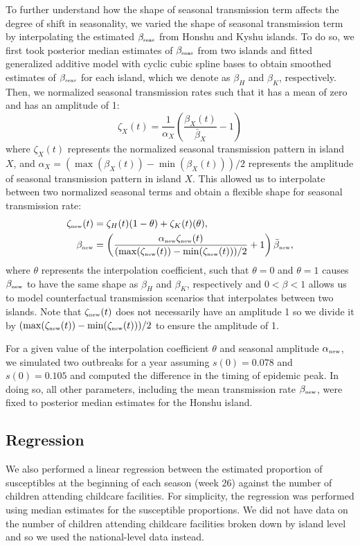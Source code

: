 \documentclass[12pt]{article}
\newcommand{\tsub}[2]{#1_{{\textrm{\tiny #2}}}}
\begin{document}
To further understand how the shape of seasonal transmission term affects the degree of shift in seasonality, we varied the shape of seasonal transmission term by interpolating the estimated $\tsub{\beta}{seas}$ from Honshu and Kyshu islands.
To do so, we first took posterior median estimates of $\tsub{\beta}{seas}$ from two islands and fitted generalized additive model with cyclic cubic spline bases to obtain smoothed estimates of $\tsub{\beta}{seas}$ for each island, which we denote as $\beta_H$ and $\beta_K$, respectively.
Then, we normalized seasonal transmission rates such that it has a mean of zero and has an amplitude of 1:
\begin{equation}
\zeta_X(t) = \frac{1}{\alpha_X} \left(\frac{\beta_{X}(t)}{\bar{\beta}_X} - 1\right)
\end{equation}
where $\zeta_X(t)$ represents the normalized seasonal transmission pattern in island $X$,
and $\alpha_X = (\max(\beta_X(t)) - \min(\beta_X(t)))/2$ represents the amplitude of seasonal transmission pattern in island $X$.
This allowed us to interpolate between two normalized seasonal terms and obtain a flexible shape for seasonal transmission rate:
\begin{align}
\tsub{\zeta}{new}(t) &= \zeta_H(t) (1-\theta) + \zeta_K(t)(\theta),\\
\tsub{\beta}{new} &= \left(\frac{\tsub{\alpha}{new} \tsub{\zeta}{new}(t)}{(\max(\tsub{\zeta}{new}(t))-\min(\tsub{\zeta}{new}(t)))/2} + 1\right) \tsub{\bar{\beta}}{new},
\end{align}
where $\theta$ represents the interpolation coefficient, such that $\theta=0$ and $\theta=1$ causes $\tsub{\beta}{new}$ to have the same shape as $\beta_H$ and $\beta_K$, respectively and $0 < \beta < 1$ allows us to model counterfactual transmission scenarios that interpolates between two islands.
Note that $\tsub{\zeta}{new}(t)$ does not necessarily have an amplitude 1 so we divide it by $(\max(\tsub{\zeta}{new}(t))-\min(\tsub{\zeta}{new}(t)))/2$ to ensure the amplitude of 1.

For a given value of the interpolation coefficient $\theta$ and seasonal amplitude $\tsub{\alpha}{new}$, we simulated two outbreaks for a year assuming $s(0) = 0.078$ and $s(0)=0.105$ and computed the difference in the timing of epidemic peak.
In doing so, all other parameters, including the mean transmission rate $\tsub{\beta}{new}$, were fixed to posterior median estimates for the Honshu island. 

\subsection*{Regression}

We also performed a linear regression between the estimated proportion of susceptibles at the beginning of each season (week 26) against the number of children attending childcare facilities.
For simplicity, the regression was performed using median estimates for the susceptible proportions.
We did not have data on the number of children attending childcare facilities broken down by island level and so we used the national-level data instead.

\pagebreak


\end{document}

